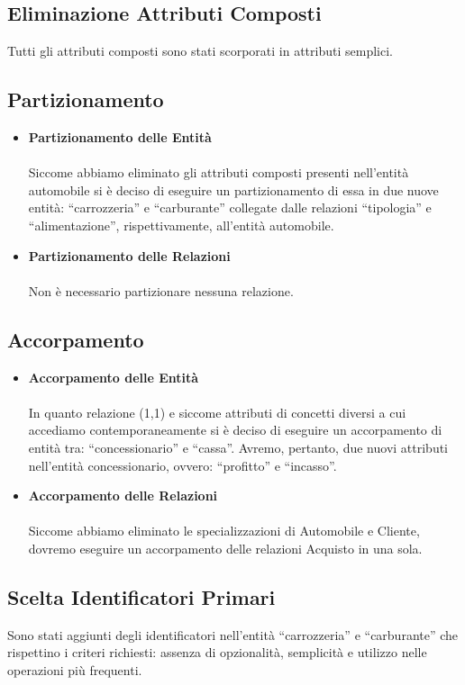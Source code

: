 \documentclass[12pt,a4paper]{article}
\begin{document}
\pagebreak
\subsection{Eliminazione Attributi Composti}

	Tutti gli attributi composti sono stati scorporati in attributi semplici.

\subsection{Partizionamento}
\begin{itemize}
	\item \textbf{Partizionamento delle Entità}\\
	\\
	Siccome abbiamo eliminato gli attributi composti presenti nell’entità automobile si è deciso di eseguire un partizionamento di essa in due nuove entità: “carrozzeria” e “carburante” collegate dalle relazioni “tipologia” e “alimentazione”, rispettivamente, all’entità automobile.
	\item \textbf{Partizionamento delle Relazioni}\\
	\\
	Non è necessario partizionare nessuna relazione.
\end{itemize} 
\subsection{Accorpamento}
\begin{itemize}
	\item \textbf{Accorpamento delle Entità}\\
	\\
	In quanto relazione (1,1) e siccome attributi di concetti diversi a cui accediamo contemporaneamente si è deciso di eseguire un accorpamento di entità tra: “concessionario” e “cassa”. Avremo, pertanto, due nuovi attributi nell’entità concessionario, ovvero: “profitto” e “incasso”.
	\item \textbf{Accorpamento delle Relazioni}\\
	\\
	Siccome abbiamo eliminato le specializzazioni di Automobile e Cliente, dovremo eseguire un accorpamento delle relazioni Acquisto in una sola.
\end{itemize} 
\pagebreak
	
\subsection{Scelta Identificatori Primari}
Sono stati aggiunti degli identificatori nell’entità “carrozzeria” e “carburante” che rispettino i criteri richiesti: assenza di opzionalità, semplicità e utilizzo nelle operazioni più frequenti.
 
\end{document}
